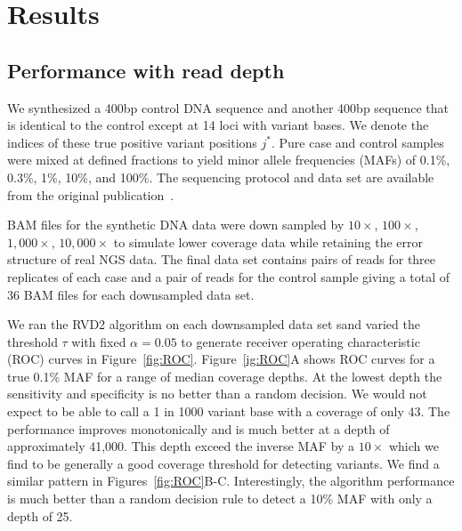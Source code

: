 \documentclass[11pt,reqno]{amsart}
\begin{document}
\section{Results}

\subsection{Performance with read depth}\label{sec:read_depth}

We synthesized a 400bp control DNA sequence and another 400bp sequence that is identical to the control except at 14 loci with variant bases. We denote the indices of these true positive variant positions $j^*$. Pure case and control samples were mixed at defined fractions to yield minor allele frequencies (MAFs) of 0.1\%, 0.3\%, 1\%, 10\%, and 100\%. The sequencing protocol and data set are available from the original publication~\cite{}.

BAM files for the synthetic DNA data were down sampled by $10\times$, $100\times$, $1,000\times$, $10,000\times$ to simulate lower coverage data while retaining the error structure of real NGS data. The final data set contains pairs of reads for three replicates of each case and a pair of reads for the control sample giving a total of 36 BAM files for each downsampled data set.

We ran the RVD2 algorithm on each downsampled data set sand varied the threshold $\tau$ with fixed $\alpha=0.05$ to generate receiver operating characteristic (ROC) curves in Figure~\ref{fig:ROC}. Figure~\ref{ig:ROC}A shows ROC curves for a true 0.1\% MAF for a range of median coverage depths. At the lowest depth the sensitivity and specificity is no better than a random decision. We would not expect to be able to call a 1 in 1000 variant base with a coverage of only 43. The performance improves monotonically and is much better at a depth of approximately 41,000. This depth exceed the inverse MAF by a $10\times$ which we find to be generally a good coverage threshold for detecting variants. We find a similar pattern in Figures~\ref{fig:ROC}B-C. Interestingly, the algorithm performance is much better than a random decision rule to detect a 10\% MAF with only a depth of 25.
\end{document}
